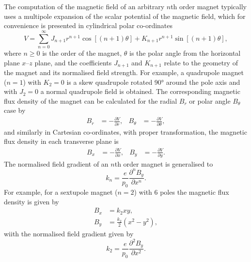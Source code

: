 \documentclass[../main.tex]{subfiles}
\begin{document}
The computation of the magnetic field of an arbitrary $n$th order magnet typically uses a multipole expansion of the scalar potential of the magnetic field, which for convenience is presented in cylindrical polar co-ordinates \cite{shepherd2016magnet}
\begin{equation}
V = \sum_{n=0}^{\infty} J_{n+1}r^{n+1}\cos\left[\left(n+1\right)\theta\right]+K_{n+1}r^{n+1}\sin\left[\left(n+1\right)\theta\right],
\label{eq:multipole_scalar_potential}    
\end{equation}
where $n \geq 0$ is the order of the magnet, $\theta$ is the polar angle from the horizontal plane  $x$--$z$ plane, and the coefficients $J_{n+1}$ and $K_{n+1}$ relate to the geometry of the magnet and its normalised field strength. For example, a quadrupole magnet ($n=1$) with $K_{2}=0$ is a skew quadrupole rotated 90\si{\degree} around the pole axis and with $J_{2}=0$ a normal quadrupole field  is obtained. The corresponding magnetic flux density of the magnet can be calculated for the radial $B_{r}$ or polar angle $B_{\theta}$ case by    
\begin{align}
B_{r} &= -\frac{\partial V}{\partial r}, & B_{\theta} &= -\frac{\partial V}{\partial \theta},
\label{eq:multipole_magnetic_field_cylindrical}    
\end{align}
and similarly in Cartesian co-ordinates, with proper transformation, the magnetic flux density in each transverse plane is
\begin{align}
B_{x} &= -\frac{\partial V}{\partial x}, & B_{y} &= -\frac{\partial V}{\partial y}.
\label{eq:multipole_magnetic_field_cartesian}
\end{align}
The normalised field gradient of an $n$th order magnet is generalised to
\begin{equation}
k_{n} = \frac{e}{p_{0}}\frac{\partial^{n} B_{y}}{\partial x^{n}}.
\label{eq:multipole_normalised_field_gradient}    
\end{equation}
For example, for a sextupole magnet ($n=2$) with 6 poles the magnetic flux density is given by
\begin{align}
B_{x} &= k_{2}xy, \nonumber \\
B_{y} &= \frac{k_{2}}{2}\left(x^{2}-y^{2}\right),
\label{eq:sextupole_magnetic_field}    
\end{align}
wiith the normalised field gradient given by 
\begin{equation}
k_{2} = \frac{e}{p_{0}}\frac{\partial^{2}B_{y}}{\partial x^{2}}.
\label{eq:sextupole_field_gradient}    
\end{equation}
\end{document}
